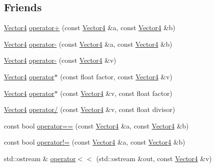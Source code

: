 \subsection*{Friends}
\begin{DoxyCompactItemize}
\item 
\hyperlink{classprism_1_1_vector4}{Vector4} \hyperlink{classprism_1_1_vector4_ae6ce8e3ce943c6e0e021eb292bb01208}{operator+} (const \hyperlink{classprism_1_1_vector4}{Vector4} \&a, const \hyperlink{classprism_1_1_vector4}{Vector4} \&b)
\item 
\hyperlink{classprism_1_1_vector4}{Vector4} \hyperlink{classprism_1_1_vector4_a9b64f4645ae585ab1e5fa126dd98f5fa}{operator-\/} (const \hyperlink{classprism_1_1_vector4}{Vector4} \&a, const \hyperlink{classprism_1_1_vector4}{Vector4} \&b)
\item 
\hyperlink{classprism_1_1_vector4}{Vector4} \hyperlink{classprism_1_1_vector4_a7e3cd0b84429212e7bc90b1303c40745}{operator-\/} (const \hyperlink{classprism_1_1_vector4}{Vector4} \&v)
\item 
\hyperlink{classprism_1_1_vector4}{Vector4} \hyperlink{classprism_1_1_vector4_adf3322b5c26c3980099d4107de87da3f}{operator$\ast$} (const float factor, const \hyperlink{classprism_1_1_vector4}{Vector4} \&v)
\item 
\hyperlink{classprism_1_1_vector4}{Vector4} \hyperlink{classprism_1_1_vector4_a81501097861bb0b690ca7c90e2e1d939}{operator$\ast$} (const \hyperlink{classprism_1_1_vector4}{Vector4} \&v, const float factor)
\item 
\hyperlink{classprism_1_1_vector4}{Vector4} \hyperlink{classprism_1_1_vector4_ab5fc8b1992d116a82ba7f98c5abb5aab}{operator/} (const \hyperlink{classprism_1_1_vector4}{Vector4} \&v, const float divisor)
\item 
const bool \hyperlink{classprism_1_1_vector4_a33f84e1c4932af7978db9d5f0e20dfbb}{operator==} (const \hyperlink{classprism_1_1_vector4}{Vector4} \&a, const \hyperlink{classprism_1_1_vector4}{Vector4} \&b)
\item 
const bool \hyperlink{classprism_1_1_vector4_ac0b8fb256f3d31d841e810255069ffeb}{operator!=} (const \hyperlink{classprism_1_1_vector4}{Vector4} \&a, const \hyperlink{classprism_1_1_vector4}{Vector4} \&b)
\item 
std\+::ostream \& \hyperlink{classprism_1_1_vector4_ad3d5a5ec411160580fac5b90bb0fa28c}{operator$<$$<$} (std\+::ostream \&out, const \hyperlink{classprism_1_1_vector4}{Vector4} \&v)
\end{DoxyCompactItemize}


